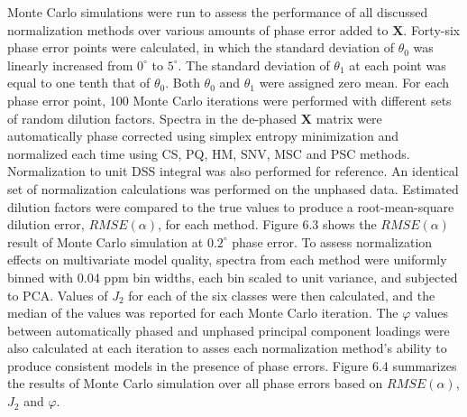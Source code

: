 \begin{doublespace}
Monte Carlo simulations were run to assess the performance of all discussed
normalization methods over various amounts of phase error added to
$\mathbf{X}$. Forty-six phase error points were calculated, in which the
standard deviation of $\theta_0$ was linearly increased from $0^\circ$ to
$5^\circ$. The standard deviation of $\theta_1$ at each point was equal to
one tenth that of $\theta_0$. Both $\theta_0$ and $\theta_1$ were assigned
zero mean. For each phase error point, 100 Monte Carlo iterations were
performed with different sets of random dilution factors. Spectra in the
de-phased $\mathbf{X}$ matrix were automatically phase corrected using simplex
entropy minimization and normalized each time using CS, PQ, HM, SNV, MSC and
PSC methods. Normalization to unit DSS integral was also performed for
reference. An identical set of normalization calculations was performed on the
unphased data. Estimated dilution factors were compared to the true values
to produce a root-mean-square dilution error, $RMSE(\alpha)$, for each method.
Figure 6.3 shows the $RMSE(\alpha)$ result of Monte Carlo simulation at
$0.2^\circ$ phase error. To assess normalization effects on multivariate model
quality, spectra from each method were uniformly binned with 0.04 ppm bin
widths, each bin scaled to unit variance, and subjected to PCA. Values of
$J_2$ for each of the six classes were then calculated, and the median of the
values was reported for each Monte Carlo iteration. The $\varphi$ values
between automatically phased and unphased principal component loadings were
also calculated at each iteration to asses each normalization method's ability
to produce consistent models in the presence of phase errors. Figure 6.4
summarizes the results of Monte Carlo simulation over all phase errors based
on $RMSE(\alpha)$, $J_2$ and $\varphi$.
\end{doublespace}

